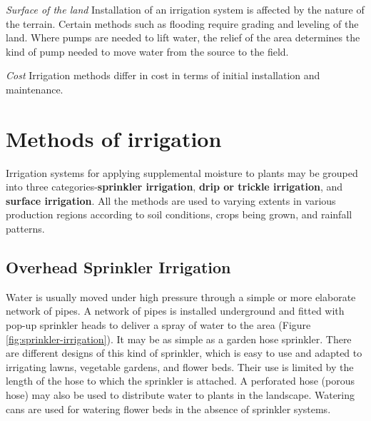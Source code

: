 \documentclass[
]{article}
\begin{document}
\emph{Surface of the land}
\newline Installation of an irrigation system is affected by the nature of the terrain. Certain methods such as flooding require grading and leveling of the land. Where pumps are needed to lift water, the relief of the area determines the kind of pump needed to move water from the source to the field.

\emph{Cost}
\newline Irrigation methods differ in cost in terms of initial installation and maintenance.

\hypertarget{methods-of-irrigation}{%
\section{Methods of irrigation}\label{methods-of-irrigation}}

Irrigation systems for applying supplemental moisture to plants may be grouped into three categories-\textbf{sprinkler irrigation}, \textbf{drip or trickle irrigation}, and \textbf{surface irrigation}. All the methods are used to varying extents in various production regions according to soil conditions, crops being grown, and rainfall patterns.

\hypertarget{overhead-sprinkler-irrigation}{%
\subsection{Overhead Sprinkler Irrigation}\label{overhead-sprinkler-irrigation}}

Water is usually moved under high pressure through a simple or more elaborate network of pipes. A network of pipes is installed underground and fitted with pop-up sprinkler heads to deliver a spray of water to the area (Figure \ref{fig:sprinkler-irrigation}). It may be as simple as a garden hose sprinkler. There are different designs of this kind of sprinkler, which is easy to use and adapted to irrigating lawns, vegetable gardens, and flower beds. Their use is limited by the length of the hose to which the sprinkler is attached. A perforated hose (porous hose) may also be used to distribute water to plants in the landscape. Watering cans are used for watering flower beds in the absence of sprinkler systems.
\end{document}
